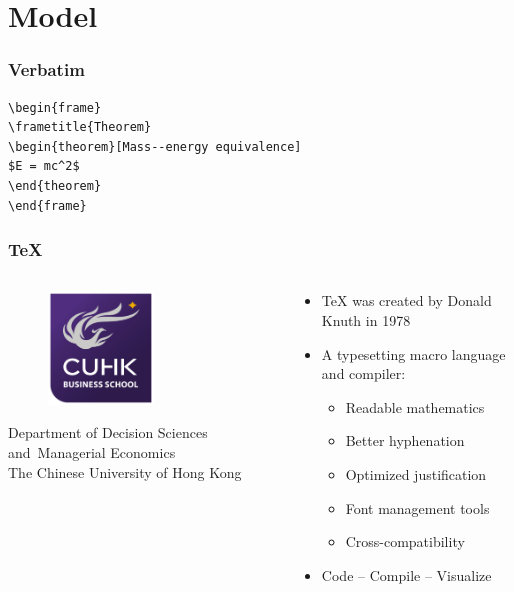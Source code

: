 \documentclass[10pt,aspectratio=32]{beamer}
\begin{document}
\section{Model}


\begin{frame}[fragile] %
\frametitle{Verbatim}
\begin{example}
\begin{verbatim}
\begin{frame}
\frametitle{Theorem}
\begin{theorem}[Mass--energy equivalence]
$E = mc^2$
\end{theorem}
\end{frame}\end{verbatim}
\end{example}
\end{frame}


\begin{frame}
	\frametitle{\TeX{}}
	\begin{columns}
		\begin{column}{4cm}
			\begin{figure}
				\includegraphics[height=3cm]{cuba_logo}
			\end{figure}
			\begin{center}
				\tiny
				Department of Decision Sciences and\
				Managerial Economics \\
				The Chinese University of Hong Kong \\
			\end{center}
		\end{column}
		\begin{column}{6cm}
			\begin{itemize}
				\item \TeX{} was created by Donald Knuth in 1978
				\item A typesetting macro language and compiler:
				\begin{itemize}
					\item Readable mathematics
					\item Better hyphenation
					\item Optimized justification
					\item Font management tools
					\item Cross-compatibility
				\end{itemize}
				\item Code -- Compile -- Visualize
			\end{itemize}
		\end{column}
	\end{columns}
\end{frame}
\end{document}
